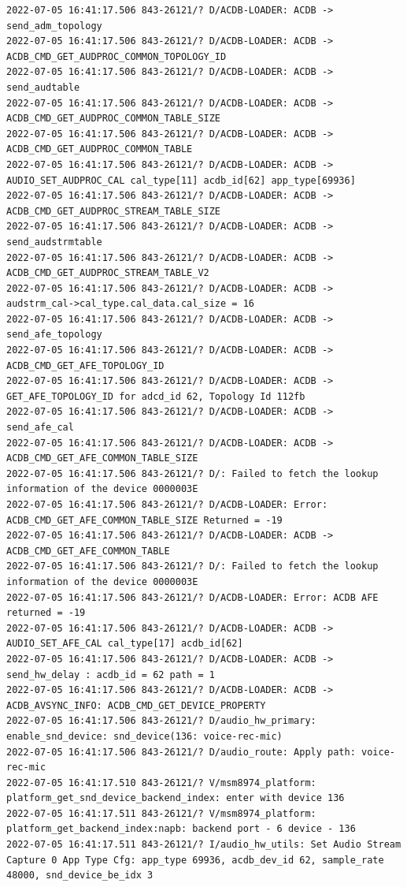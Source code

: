 \documentclass[a4paper,12pt]{book}
\begin{document}
\begin{lstlisting}
2022-07-05 16:41:17.506 843-26121/? D/ACDB-LOADER: ACDB -> send_adm_topology
2022-07-05 16:41:17.506 843-26121/? D/ACDB-LOADER: ACDB -> ACDB_CMD_GET_AUDPROC_COMMON_TOPOLOGY_ID
2022-07-05 16:41:17.506 843-26121/? D/ACDB-LOADER: ACDB -> send_audtable
2022-07-05 16:41:17.506 843-26121/? D/ACDB-LOADER: ACDB -> ACDB_CMD_GET_AUDPROC_COMMON_TABLE_SIZE
2022-07-05 16:41:17.506 843-26121/? D/ACDB-LOADER: ACDB -> ACDB_CMD_GET_AUDPROC_COMMON_TABLE
2022-07-05 16:41:17.506 843-26121/? D/ACDB-LOADER: ACDB -> AUDIO_SET_AUDPROC_CAL cal_type[11] acdb_id[62] app_type[69936]
2022-07-05 16:41:17.506 843-26121/? D/ACDB-LOADER: ACDB -> ACDB_CMD_GET_AUDPROC_STREAM_TABLE_SIZE
2022-07-05 16:41:17.506 843-26121/? D/ACDB-LOADER: ACDB -> send_audstrmtable
2022-07-05 16:41:17.506 843-26121/? D/ACDB-LOADER: ACDB -> ACDB_CMD_GET_AUDPROC_STREAM_TABLE_V2
2022-07-05 16:41:17.506 843-26121/? D/ACDB-LOADER: ACDB -> audstrm_cal->cal_type.cal_data.cal_size = 16
2022-07-05 16:41:17.506 843-26121/? D/ACDB-LOADER: ACDB -> send_afe_topology
2022-07-05 16:41:17.506 843-26121/? D/ACDB-LOADER: ACDB -> ACDB_CMD_GET_AFE_TOPOLOGY_ID
2022-07-05 16:41:17.506 843-26121/? D/ACDB-LOADER: ACDB -> GET_AFE_TOPOLOGY_ID for adcd_id 62, Topology Id 112fb
2022-07-05 16:41:17.506 843-26121/? D/ACDB-LOADER: ACDB -> send_afe_cal
2022-07-05 16:41:17.506 843-26121/? D/ACDB-LOADER: ACDB -> ACDB_CMD_GET_AFE_COMMON_TABLE_SIZE
2022-07-05 16:41:17.506 843-26121/? D/: Failed to fetch the lookup information of the device 0000003E 
2022-07-05 16:41:17.506 843-26121/? D/ACDB-LOADER: Error: ACDB_CMD_GET_AFE_COMMON_TABLE_SIZE Returned = -19
2022-07-05 16:41:17.506 843-26121/? D/ACDB-LOADER: ACDB -> ACDB_CMD_GET_AFE_COMMON_TABLE
2022-07-05 16:41:17.506 843-26121/? D/: Failed to fetch the lookup information of the device 0000003E 
2022-07-05 16:41:17.506 843-26121/? D/ACDB-LOADER: Error: ACDB AFE returned = -19
2022-07-05 16:41:17.506 843-26121/? D/ACDB-LOADER: ACDB -> AUDIO_SET_AFE_CAL cal_type[17] acdb_id[62]
2022-07-05 16:41:17.506 843-26121/? D/ACDB-LOADER: ACDB -> send_hw_delay : acdb_id = 62 path = 1
2022-07-05 16:41:17.506 843-26121/? D/ACDB-LOADER: ACDB -> ACDB_AVSYNC_INFO: ACDB_CMD_GET_DEVICE_PROPERTY
2022-07-05 16:41:17.506 843-26121/? D/audio_hw_primary: enable_snd_device: snd_device(136: voice-rec-mic)
2022-07-05 16:41:17.506 843-26121/? D/audio_route: Apply path: voice-rec-mic
2022-07-05 16:41:17.510 843-26121/? V/msm8974_platform: platform_get_snd_device_backend_index: enter with device 136
2022-07-05 16:41:17.511 843-26121/? V/msm8974_platform: platform_get_backend_index:napb: backend port - 6 device - 136 
2022-07-05 16:41:17.511 843-26121/? I/audio_hw_utils: Set Audio Stream Capture 0 App Type Cfg: app_type 69936, acdb_dev_id 62, sample_rate 48000, snd_device_be_idx 3

\end{lstlisting}
\end{document}
